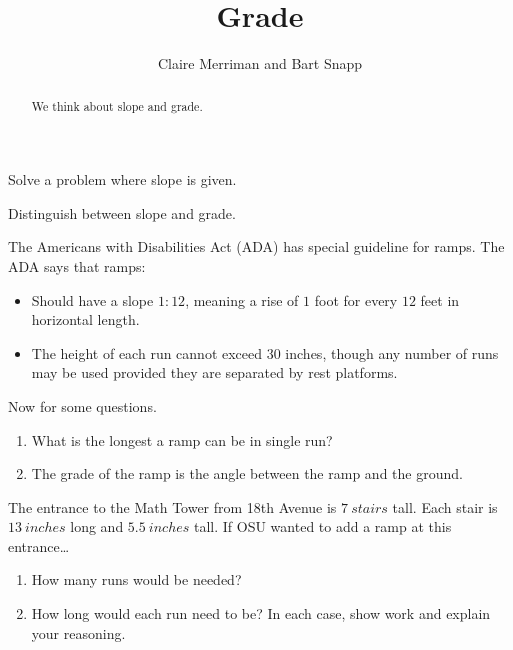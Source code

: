 \documentclass[noauthor,nooutcomes,hints,handout]{ximera}
\title{Grade}
\author{Claire Merriman and Bart Snapp}
\begin{document}
\begin{abstract}
  We think about slope and grade.
\end{abstract}
\maketitle

\begin{listOutcomes}
\item Solve a problem where slope is given.
\item Distinguish between slope and grade.
\end{listOutcomes}
\mynewpage

\begin{question}
  The Americans with Disabilities Act (ADA) has special guideline for
  ramps. The ADA says that ramps:
  \begin{itemize}
  \item Should have a slope $1:12$, meaning a rise of $1$ foot for
    every $12$ feet in horizontal length.
  \item The height of each run cannot exceed $30$ inches, though any
    number of runs may be used provided they are separated by rest
    platforms.
  \end{itemize}
  Now for some questions.
\begin{enumerate}
 \item What is the longest a ramp can be in single run?
 \item The grade of the ramp is the angle between the ramp and the
   ground.
\end{enumerate}

\end{question}

\mynewpage

\begin{question}
The entrance to the Math Tower from 18th Avenue is $7\ stairs$
tall. Each stair is $13\ inches$ long and $5.5\ inches$ tall. If OSU
wanted to add a ramp at this entrance\dots
\begin{enumerate}
\item How many runs would be needed?
\item How long would each run need to be?  In each case, show work and
  explain your reasoning.
\end{enumerate}
\end{question}

\mynewpage
\end{document}
